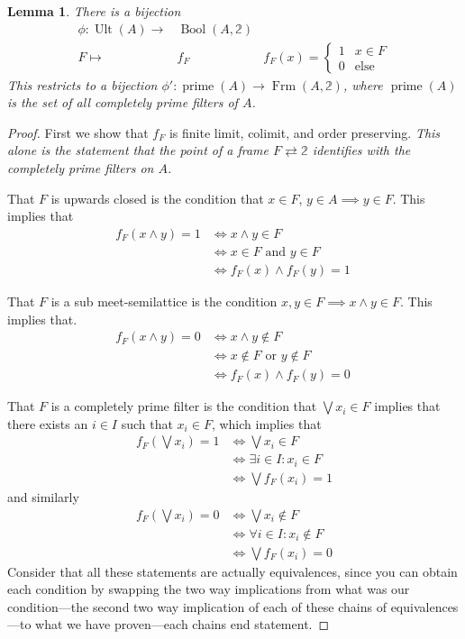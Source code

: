 \documentclass[12pt,a4paper]{article}
\newtheorem{lemma}{Lemma}[section] %
\DeclareMathOperator{\Frm}{Frm}
\DeclareMathOperator{\Bool}{Bool}
\DeclareMathOperator{\Ult}{Ult}
\DeclareMathOperator{\prim}{prime}
\begin{document}
\begin{lemma}
	There is a bijection \begin{align*}
  	\phi: \Ult(A) \to& \Bool(A, \mathbb{2})\\
  	F \mapsto& f_F &f_F(x) = \begin{cases}
   1 & x \in F \\
    0 & \text{else}
  \end{cases}
  \end{align*}
  This restricts to a bijection $\phi': \prim(A) \to \Frm(A, \mathbb{2})$, where $\prim(A)$ is the set of all completely prime filters of $A$.
\end{lemma}


 
\begin{proof}
 	First we show that $f_F$ is finite limit, colimit, and order preserving. \emph{This alone is the statement that the point of a frame $F \rightleftarrows \mathbb{2}$ identifies with the completely prime filters on $A$. }
  
 That $F$ is upwards closed is the condition that $x \in F$, $y \in A \implies y \in F$. This implies that
  \begin{align*}
 	f_F(x \wedge y) = 1 &\iff x \wedge y \in F\\ &\iff x \in F\text{ and } y \in F\\ &\iff f_F(x) \wedge f_F(y) =1 \
 \end{align*}
 
 
  That $F$ is a sub meet-semilattice is the condition $x, y \in F \implies x \land y \in F$. This implies that. \begin{align*}
 	f_F(x \wedge y) = 0 &\iff x \wedge y \notin F\\ &\iff x \notin F\text{ or } y \notin F\\ &\iff f_F(x)  \wedge f_F(y) =0 \
 \end{align*}


That $F$ is a completely prime filter is the condition that $\bigvee x_i \in F$ implies that there exists an $i \in I$ such that $x_i \in F$, which implies that \begin{align*}
	f_F( \bigvee x_i) = 1 &\iff \bigvee x_i \in F\\ &\iff \exists i \in I : x_i \in F\\
	&\iff \bigvee f_F(x_i) = 1
\end{align*}
and similarly \begin{align*}
	f_F( \bigvee x_i) = 0 &\iff \bigvee x_i \notin F\\ &\iff \forall i \in I:x_i \notin F \\
	&\iff \bigvee f_F(x_i)  = 0
\end{align*}
Consider that all these statements are actually equivalences, since you can obtain each condition by swapping the two way implications from what was our condition---the second two way implication of each of these chains of equivalences---to what we have proven---each chains end statement.


\end{proof}
\end{document}
